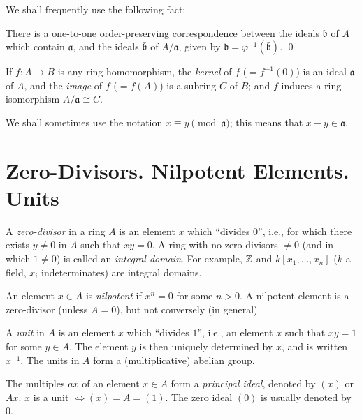 We shall frequently use the following fact:

\begin{proposition}\label{prop:ideal-correspondence}
There is a one-to-one order-preserving correspondence between the ideals $\mathfrak{b}$ of $A$ which contain $\mathfrak{a}$, and the ideals $\bar{\mathfrak{b}}$ of $A/\mathfrak{a}$, given by $\mathfrak{b} = \varphi^{-1}(\bar{\mathfrak{b}})$. \qed
\end{proposition}

If $f \colon A \to B$ is any ring homomorphism, the \emph{kernel} of $f$ ($= f^{-1}(0)$) is an ideal $\mathfrak{a}$ of $A$, and the \emph{image} of $f$ ($= f(A)$) is a subring $C$ of $B$; and $f$ induces a ring isomorphism $A/\mathfrak{a} \cong C$.

We shall sometimes use the notation $x \equiv y \pmod{\mathfrak{a}}$; this means that $x - y \in \mathfrak{a}$.


\section*{Zero-Divisors. Nilpotent Elements. Units}

A \emph{zero-divisor} in a ring $A$ is an element $x$ which ``divides $0$'', i.e., for which there exists $y \neq 0$ in $A$ such that $xy = 0$. A ring with no zero-divisors $\neq 0$ (and in which $1 \neq 0$) is called an \emph{integral domain}. For example, $\mathbb{Z}$ and $k[x_1, \ldots, x_n]$ ($k$ a field, $x_i$ indeterminates) are integral domains.

An element $x \in A$ is \emph{nilpotent} if $x^n = 0$ for some $n > 0$. A nilpotent element is a zero-divisor (unless $A = 0$), but not conversely (in general).

A \emph{unit} in $A$ is an element $x$ which ``divides $1$'', i.e., an element $x$ such that $xy = 1$ for some $y \in A$. The element $y$ is then uniquely determined by $x$, and is written $x^{-1}$. The units in $A$ form a (multiplicative) abelian group.

The multiples $ax$ of an element $x \in A$ form a \emph{principal ideal}, denoted by $(x)$ or $Ax$. $x$ is a unit $\iff (x) = A = (1)$. The zero ideal $(0)$ is usually denoted by $0$.

